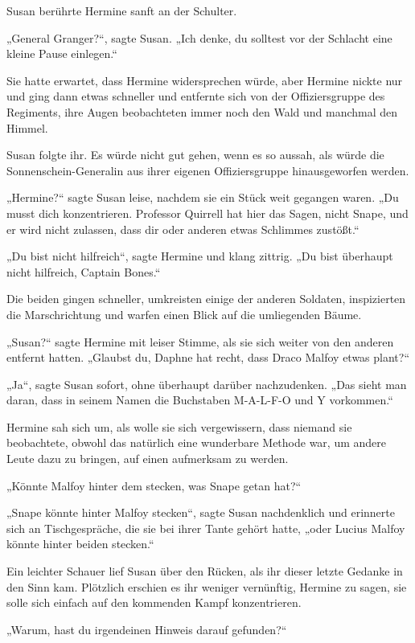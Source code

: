 {Susan berührte Hermine sanft an der Schulter.

„General Granger?“, sagte Susan. „Ich denke, du solltest vor der Schlacht eine kleine Pause einlegen.“

Sie hatte erwartet, dass Hermine widersprechen würde, aber Hermine nickte nur und ging dann etwas schneller und entfernte sich von der Offiziersgruppe des Regiments, ihre Augen beobachteten immer noch den Wald und manchmal den Himmel.

Susan folgte ihr. Es würde nicht gut gehen, wenn es so aussah, als würde die Sonnenschein-Generalin aus ihrer eigenen Offiziersgruppe hinausgeworfen werden.

„Hermine?“ sagte Susan leise, nachdem sie ein Stück weit gegangen waren. „Du musst dich konzentrieren. Professor Quirrell hat hier das Sagen, nicht Snape, und er wird nicht zulassen, dass dir oder anderen etwas Schlimmes zustößt.“

„Du bist nicht hilfreich“, sagte Hermine und klang zittrig. „Du bist überhaupt nicht hilfreich, Captain Bones.“

Die beiden gingen schneller, umkreisten einige der anderen Soldaten, inspizierten die Marschrichtung und warfen einen Blick auf die umliegenden Bäume.

„Susan?“ sagte Hermine mit leiser Stimme, als sie sich weiter von den anderen entfernt hatten. „Glaubst du, Daphne hat recht, dass Draco Malfoy etwas plant?“

„Ja“, sagte Susan sofort, ohne überhaupt darüber nachzudenken. „Das sieht man daran, dass in seinem Namen die Buchstaben M-A-L-F-O und Y vorkommen.“

Hermine sah sich um, als wolle sie sich vergewissern, dass niemand sie beobachtete, obwohl das natürlich eine wunderbare Methode war, um andere Leute dazu zu bringen, auf einen aufmerksam zu werden.

„Könnte Malfoy hinter dem stecken, was Snape getan hat?“

„Snape könnte hinter Malfoy stecken“, sagte Susan nachdenklich und erinnerte sich an Tischgespräche, die sie bei ihrer Tante gehört hatte, „oder Lucius Malfoy könnte hinter beiden stecken.“

Ein leichter Schauer lief Susan über den Rücken, als ihr dieser letzte Gedanke in den Sinn kam. Plötzlich erschien es ihr weniger vernünftig, Hermine zu sagen, sie solle sich einfach auf den kommenden Kampf konzentrieren.

„Warum, hast du irgendeinen Hinweis darauf gefunden?“

}
